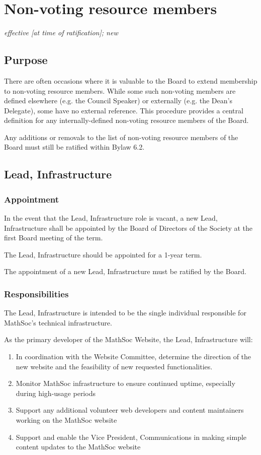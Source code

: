 \section{Non-voting resource members}
\emph{effective [at time of ratification]; new}\\

\subsection{Purpose}

There are often occasions where it is valuable to the Board to 
extend membership to non-voting resource members. While some such 
non-voting members are defined elsewhere (e.g. the Council Speaker) 
or externally (e.g. the Dean's Delegate), some have no external reference. 
This procedure provides a central definition for any 
internally-defined non-voting resource members of the Board.

Any additions or removals to the list of non-voting resource members of the Board 
must still be ratified within Bylaw 6.2.

\subsection{Lead, Infrastructure}

\subsubsection{Appointment}

In the event that the Lead, Infrastructure role is vacant, a new 
Lead, Infrastructure shall be appointed by the Board of Directors 
of the Society at the first Board meeting of the term. 

The Lead, Infrastructure should be appointed for a 1-year term. 

The appointment of a new Lead, Infrastructure must be ratified by the Board.

\subsubsection{Responsibilities}

The Lead, Infrastructure is intended to be the single individual responsible for 
MathSoc's technical infrastructure.

As the primary developer of the MathSoc Website, the Lead, Infrastructure will:
\begin{enumerate}
  \item In coordination with the Website Committee, determine the 
  direction of the new website and the feasibility of new requested functionalities.
  \item Monitor MathSoc infrastructure to ensure continued uptime, especially during high-usage periods 
  \item Support any additional volunteer web developers and content 
  maintainers working on the MathSoc website
  \item Support and enable the Vice President, Communications in making simple 
  content updates to the MathSoc website
\end{enumerate}

